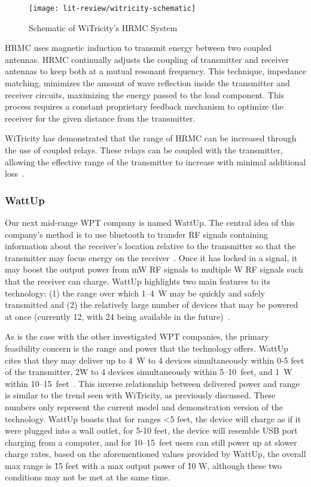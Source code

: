 \begin{figure}[t]
\centering
\texttt{[image: lit-review/witricity-schematic]}
    \caption[WiTricity schematic]{Schematic of WiTricity's HRMC System~\cite{kesler_highly_2013}}
    \label{fig:lit-review-witricity-schematic}
\end{figure}

HRMC uses magnetic induction to transmit energy between two coupled antennas. HRMC continually adjusts the coupling of transmitter and receiver antennas to keep both at a mutual resonant frequency. This technique, impedance matching, minimizes the amount of wave reflection inside the transmitter and receiver circuits, maximizing the energy passed to the load component. This process requires a constant proprietary feedback mechanism to optimize the receiver for the given distance from the transmitter.

WiTricity has demonstrated that the range of HRMC can be increased through the use of coupled relays. These relays can be coupled with the transmitter, allowing the effective range of the transmitter to increase with minimal additional loss~\cite{butler_tour_2013}.

\subsubsection{WattUp}
Our next mid-range WPT company is named WattUp. The central idea of this company's method is to use bluetooth to transfer RF signals containing information about the receiver's location relative to the transmitter so that the transmitter may focus energy on the receiver~\cite{energouscorporation2016}. Once it has locked in a signal, it may boost the output power from mW RF signals to multiple W RF signals such that the receiver can charge. WattUp highlights two main features to its technology: (1) the range over which \numrange{1}{4}~W may be quickly and safely transmitted and (2) the relatively large number of devices that may be powered at once (currently 12, with 24 being available in the future)~\cite{energouscorporation2016}.

As is the case with the other investigated WPT companies, the primary feasibility concern is the range and power that the technology offers. WattUp cites that they may deliver up to 4~W to 4 devices simultaneously within 0-5 feet of the transmitter, 2W to 4 devices simultaneously within \numrange{5}{10}~feet, and 1~W within \numrange{10}{15}~feet~\cite{energouscorporation2016}. This inverse relationship between delivered power and range is similar to the trend seen with WiTricity, as previously discussed. These numbers only represent the current model and demonstration version of the technology. WattUp boasts that for ranges <5 feet, the device will charge as if it were plugged into a wall outlet, for 5-10 feet, the device will resemble USB port charging from a computer, and for \numrange{10}{15}~feet users can still power up at slower charge rates, based on the aforementioned values provided by WattUp, the overall max range is \~15 feet with a max output power of \~10 W, although these two conditions may not be met at the same time.

